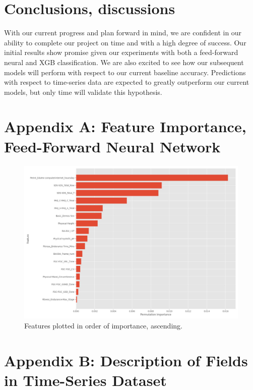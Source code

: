 \documentclass[11pt]{extarticle}
\begin{document}
\section{Conclusions, discussions}

    With our current progress and plan forward in mind, we are confident in our ability to complete our project on time and with a high degree of success.
    Our initial results show promise given our experiments with both a feed-forward neural and XGB classification.
    We are also excited to see how our subsequent models will perform with respect to our current baseline accuracy.
    Predictions with respect to time-series data are expected to greatly outperform our current models, but only time will validate this hypothesis.

\pagebreak




\pagebreak

\section*{Appendix A: Feature Importance, Feed-Forward Neural Network}

\begin{figure}[h!]
    \centering
    \includegraphics[scale=0.4]{"./images/feature_importance.jpg"}
    \caption{Features plotted in order of importance, ascending.}
\end{figure}

\section*{Appendix B: Description of Fields in Time-Series Dataset}
\end{document}
